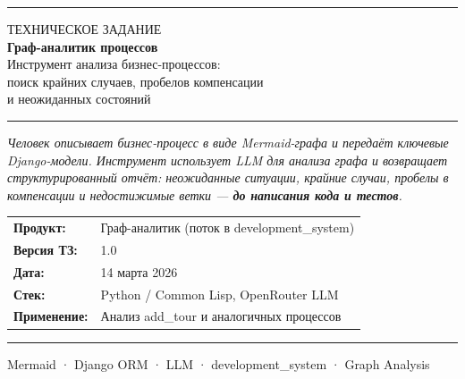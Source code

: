 \documentclass[11pt, a4paper, oneside]{article}
\begin{document}
\begin{titlepage}
\centering
\vspace*{18mm}

{\color{AccentBlue}\rule{\textwidth}{1.5pt}}
\vspace{8mm}

{\sffamily\fontsize{10}{12}\color{MidGray} ТЕХНИЧЕСКОЕ ЗАДАНИЕ}\\[6mm]

{\sffamily\fontsize{22}{28}\bfseries\color{AccentBlue}
  Граф-аналитик процессов
}\\[4mm]

{\sffamily\fontsize{13}{16}\color{DarkGray}
  Инструмент анализа бизнес-процессов:\\
  поиск крайних случаев, пробелов компенсации\\
  и неожиданных состояний
}

\vspace{10mm}
{\color{AccentBlue}\rule{\textwidth}{0.4pt}}
\vspace{10mm}

\begin{minipage}{0.85\textwidth}
\centering\itshape\color{DarkGray}\fontsize{11}{15}\selectfont
Человек описывает бизнес-процесс в виде Mermaid-графа
и передаёт ключевые Django-модели. Инструмент использует LLM
для анализа графа и возвращает структурированный отчёт:
неожиданные ситуации, крайние случаи, пробелы в компенсации
и недостижимые ветки — \textbf{до написания кода и тестов}.
\end{minipage}

\vfill

\begin{tabular}{ll}
  \textbf{Продукт:}       & Граф-аналитик (поток в development\_system) \\[3pt]
  \textbf{Версия ТЗ:}     & 1.0 \\[3pt]
  \textbf{Дата:}          & 14 марта 2026 \\[3pt]
  \textbf{Стек:}          & Python / Common Lisp, OpenRouter LLM \\[3pt]
  \textbf{Применение:}    & Анализ add\_tour и аналогичных процессов \\
\end{tabular}

\vspace{10mm}
{\color{AccentBlue}\rule{\textwidth}{0.4pt}}
{\small\color{MidGray}
  Mermaid · Django ORM · LLM · development\_system · Graph Analysis
}
\end{titlepage}
\end{document}
